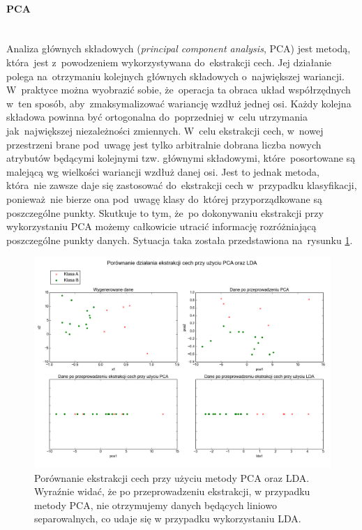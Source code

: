 \paragraph{PCA}\mbox{}\\
Analiza głównych składowych (\textit{principal component analysis}, PCA)\cite{pcaReference} jest metodą, która~jest z~powodzeniem wykorzystywana do~ekstrakcji cech. Jej działanie polega na~otrzymaniu kolejnych głównych składowych o~największej wariancji. W~praktyce można wyobrazić sobie, że~operacja ta obraca układ współrzędnych w~ten sposób, aby~zmaksymalizować wariancję wzdłuż jednej osi. Każdy kolejna składowa powinna być ortogonalna do~poprzedniej w~celu utrzymania jak~największej niezależności zmiennych. W~celu ekstrakcji cech, w~nowej przestrzeni brane pod~uwagę jest tylko arbitralnie dobrana liczba nowych atrybutów będącymi kolejnymi tzw. głównymi składowymi, które~posortowane są malejącą wg wielkości wariancji wzdłuż danej osi. Jest to jednak metoda, która~nie zawsze daje się zastosować do~ekstrakcji cech w~przypadku klasyfikacji, ponieważ~nie bierze ona pod~uwagę klasy do~której przyporządkowane są poszczególne punkty. Skutkuje to tym, że~po dokonywaniu ekstrakcji przy wykorzystaniu PCA możemy całkowicie utracić informację rozróżniającą poszczególne punkty danych. Sytuacja taka została przedstawiona na~rysunku \ref{pcaIsShit}.


\begin{figure}[ht!]
\centering
\includegraphics[scale=0.5]{res/pcalda.png}
\caption[Caption for LOF]{Porównanie ekstrakcji cech przy użyciu metody PCA oraz LDA. Wyraźnie widać, że po przeprowadzeniu ekstrakcji, w przypadku metody PCA, nie otrzymujemy danych będących liniowo separowalnych, co udaje się w przypadku wykorzystaniu LDA.} \label{pcaIsShit} 
\end{figure}


